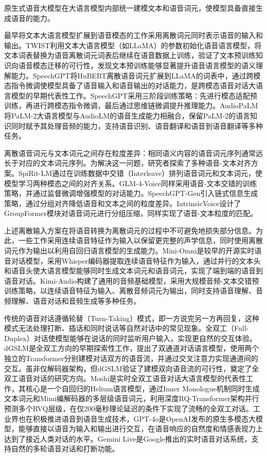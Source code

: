 原生式语音大模型在大语言模型内部统一建模文本和语音词元，使模型具备直接生成语音的能力。

最早将文本大语言模型扩展到语音模态的工作采用离散词元同时表示语音的输入和输出。TWIST\citep{twist}利用文本大语言模型（如LLaMA）的参数初始化语音语言模型，将文本词表替换为语音离散词元词表后继续在语音数据上训练，验证了文本预训练知识向语音模态迁移的可行性，发现文本预训练能够显著提升语音语言模型的语义理解能力。SpeechGPT\citep{zhang-etal-2023-speechgpt}将HuBERT离散语音词元扩展到LLaMA的词表中，通过跨模态指令微调使模型具备了语音输入和语音输出的对话能力，是跨模态语音对话大语言模型的早期代表性工作。SpeechGPT采用三阶段训练策略：先进行模态适配预训练，再进行跨模态指令微调，最后通过思维链微调提升推理能力。AudioPaLM\citep{rubenstein2023audiopalm}将PaLM-2大语言模型与AudioLM的语音生成能力相融合，保留PaLM-2的语言知识同时赋予其处理音频的能力，支持语音识别、语音翻译和语音到语音翻译等多种任务。

离散语音词元与文本词元之间存在粒度差异：相同语义内容的语音词元序列通常远长于对应的文本词元序列。为解决这一问题，研究者探索了多种语音-文本对齐方案。SpiRit-LM\citep{nguyen2024spirit}通过在训练数据中交错（Interleave）排列语音词元和文本词元，使模型学习两种模态之间的对齐关系。GLM-4-Voice\citep{glm4voice}同样采用语音-文本交错的训练策略，并通过监督微调增强模型的对话能力。SpeechGPT-Gen\citep{zhang2024speechgptgen}引入链式信息生成策略，通过分组对齐降低语音和文本之间的粒度差异。IntrinsicVoice\citep{zhang2024intrinsicvoice}设计了GroupFormer模块对语音词元进行分组压缩，同样实现了语音-文本粒度的匹配。

上述离散输入方案在将语音转换为离散词元的过程中不可避免地损失部分信息。为此，一些工作采用连续语音特征作为输入以保留更完整的声学信息，同时使用离散词元作为输出以利用自回归语言模型的生成能力。Mini-Omni\citep{xie2024mini}是较早的开源实时语音对话模型，采用Whisper编码器提取连续语音特征作为输入，通过并行的文本头和语音头使大语言模型能够同时生成文本词元和语音词元，实现了端到端的语音到语音对话。Kimi-Audio\citep{moonshot2025kimiaudio}构建了通用的音频基础模型，采用大规模音频-文本交错预训练策略，以连续语音特征为输入、离散音频词元为输出，同时支持语音理解、音频理解、语音对话和音频生成等多种任务。

传统的语音对话遵循轮替（Turn-Taking）模式，即一方说完另一方再回复，这种模式无法处理打断、插话和同时说话等自然对话中的常见现象。全双工（Full-Duplex）对话使模型能够在说话的同时监听用户输入，实现更自然的交互体验。dGSLM\citep{nguyen2022dgslm}是全双工方向的早期探索性工作，提出了双通道对话语言模型，使用两个独立的Transformer分别建模对话双方的语音流，并通过交叉注意力实现通道间的交互。虽非仅解码器架构，但dGSLM验证了建模双向语音流的可行性，奠定了全双工语音对话的研究方向。Moshi\citep{kyutai2024moshi}是实时全双工语音对话大语言模型的代表性工作，其核心是一个自回归的Helium语言模型，通过Inner Monologue机制同时生成文本词元和Mimi编解码器的多层级语音词元，利用深度RQ-Transformer架构并行预测多个RVQ层级，在仅200毫秒理论延迟的条件下实现了流畅的全双工对话。工业界也在积极推进语音到语音生成技术，GPT-4o\citep{gpt4o}是OpenAI发布的原生多模态大模型，能够直接以语音为输入和输出进行交互，在语音响应的自然度和情感表现力上达到了接近人类对话的水平。Gemini Live\citep{google2024gemini}是Google推出的实时语音对话系统，支持自然的多轮语音对话和打断功能。

